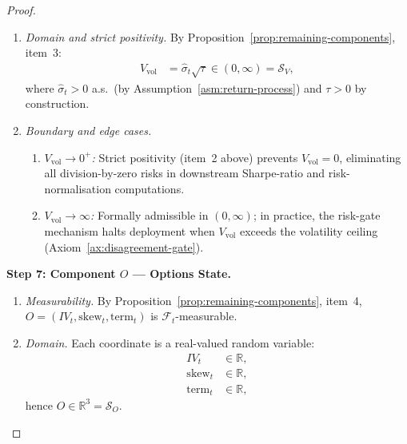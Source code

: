 \documentclass[12pt,openany]{book}
\newcommand{\calF}{\mathcal{F}}
\numberwithin{equation}{chapter}
\theoremstyle{plain}
\theoremstyle{definition}
\theoremstyle{remark}
\numberwithin{equation}{chapter}
\theoremstyle{plain}
\begin{document}
\begin{proof}
\begin{enumerate}
  \item \emph{Domain and strict positivity.}
    By Proposition~\ref{prop:remaining-components}, item~3:
    \begin{align}
      V_{\mathrm{vol}}
        &= \hat{\sigma}_t \sqrt{\tau}
         \in (0, \infty)
         = \mathcal{S}_V,
    \end{align}
    where $\hat{\sigma}_t > 0$ a.s.\ (by
    Assumption~\ref{asm:return-process}) and $\tau > 0$
    by construction.

  \item \emph{Boundary and edge cases.}
    \begin{enumerate}
      \item \emph{$V_{\mathrm{vol}} \to 0^+$:}
        Strict positivity (item~2 above) prevents
        $V_{\mathrm{vol}} = 0$, eliminating all
        division-by-zero risks in downstream Sharpe-ratio
        and risk-normalisation computations.
      \item \emph{$V_{\mathrm{vol}} \to \infty$:}
        Formally admissible in $(0,\infty)$; in practice,
        the risk-gate mechanism halts deployment when
        $V_{\mathrm{vol}}$ exceeds the volatility ceiling
        (Axiom~\ref{ax:disagreement-gate}).
    \end{enumerate}
\end{enumerate}

\medskip
\noindent\textbf{Step 7: Component $O$ — Options State.}
\begin{enumerate}
  \item \emph{Measurability.}
    By Proposition~\ref{prop:remaining-components}, item~4,
    $O = (IV_t, \mathrm{skew}_t, \mathrm{term}_t)$ is
    $\calF_t$-measurable.

  \item \emph{Domain.}
    Each coordinate is a real-valued random variable:
    \begin{align}
      IV_t
        &\in \mathbb{R}, \\[2pt]
      \mathrm{skew}_t
        &\in \mathbb{R}, \\[2pt]
      \mathrm{term}_t
        &\in \mathbb{R},
    \end{align}
    hence $O \in \mathbb{R}^3 = \mathcal{S}_O$.


\end{enumerate}
\end{proof}
\end{document}
